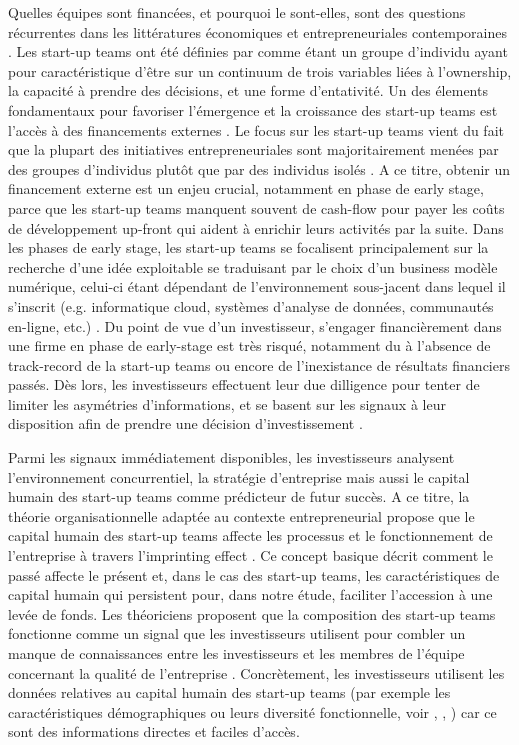 \documentclass[12pt]{article}
\begin{document}
Quelles équipes sont financées, et pourquoi le sont-elles, sont des questions récurrentes dans les littératures économiques et entrepreneuriales contemporaines \citep{knight2020start}. Les start-up teams ont été définies par \citet{knight2020start} comme étant un groupe d'individu ayant pour caractéristique d'être sur un continuum de trois variables liées à l'ownership, la capacité à prendre des décisions, et une forme d'entativité. Un des élements fondamentaux pour favoriser l'émergence et la croissance des start-up teams est l'accès à des financements externes \citep{klein2020start}. Le focus sur les start-up teams vient du fait que la plupart des initiatives entrepreneuriales sont majoritairement menées par des groupes d'individus plutôt que par des individus isolés \citep{klotz2014new, roure1990predictors}. A ce titre, obtenir un financement externe est un enjeu crucial, notamment en phase de early stage, parce que les start-up teams manquent souvent de cash-flow pour payer les coûts de développement up-front qui aident à enrichir leurs activités par la suite. Dans les phases de early stage, les start-up teams se focalisent principalement sur la recherche d'une idée exploitable se traduisant par le choix d'un business modèle numérique, celui-ci étant dépendant de l'environnement sous-jacent dans lequel il s'inscrit (e.g. informatique cloud, systèmes d’analyse de données, communautés en-ligne, etc.) \citep{nambisan2017digital}. Du point de vue d'un investisseur, s'engager financièrement dans une firme en phase de early-stage est très risqué, notamment du à l'absence de track-record de la start-up teams ou encore de l'inexistance de résultats financiers passés. Dès lors, les investisseurs effectuent leur due dilligence pour tenter de limiter les asymétries d'informations, et se basent sur les signaux \citep{spence1978job} à leur disposition afin de prendre une décision d'investissement \citep{ko2018signaling}.

Parmi les signaux immédiatement disponibles, les investisseurs analysent l'environnement concurrentiel, la stratégie d'entreprise mais aussi le capital humain des start-up teams comme prédicteur de futur succès. A ce titre, la théorie organisationnelle adaptée au contexte entrepreneurial propose que le capital humain des start-up teams affecte les processus et le fonctionnement de l'entreprise à travers l'imprinting effect \citep{packalen2007complementing}. Ce concept basique décrit comment le passé affecte le présent et, dans le cas des start-up teams, les caractéristiques de capital humain qui persistent pour, dans notre étude, faciliter l'accession à une levée de fonds. Les théoriciens proposent que la composition des start-up teams fonctionne comme un signal \citep{spence1974market} que les investisseurs utilisent pour combler un manque de connaissances entre les investisseurs et les membres de l'équipe concernant la qualité de l'entreprise \citep{plummer2016better}. Concrètement, les investisseurs utilisent les données relatives au capital humain des start-up teams (par exemple les caractéristiques démographiques ou leurs diversité fonctionnelle, voir \citet{eddleston2016you}, \citet{beckman2007early}, \citet{colombo2005founders}) car ce sont des informations directes et faciles d'accès.
\end{document}
